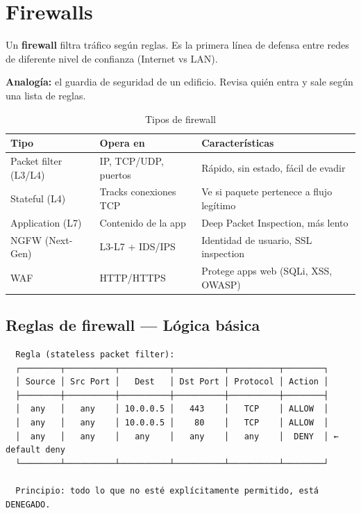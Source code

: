 \section{ Firewalls}

\begin{concepto}
Un \textbf{firewall} filtra tráfico según reglas. Es la primera línea
de defensa entre redes de diferente nivel de confianza (Internet vs LAN).

 \textbf{Analogía:} el guardia de seguridad de un edificio.
Revisa quién entra y sale según una lista de reglas.
\end{concepto}

\begin{table}[h!]
\centering
\renewcommand{\arraystretch}{1.4}
\begin{tabular}{lll}
\toprule
\textbf{Tipo} & \textbf{Opera en} & \textbf{Características} \\
\midrule
Packet filter (L3/L4) & IP, TCP/UDP, puertos & Rápido, sin estado, fácil de evadir \\
Stateful (L4)         & Tracks conexiones TCP & Ve si paquete pertenece a flujo legítimo \\
Application (L7)      & Contenido de la app   & Deep Packet Inspection, más lento \\
NGFW (Next-Gen)       & L3-L7 + IDS/IPS       & Identidad de usuario, SSL inspection \\
WAF                   & HTTP/HTTPS            & Protege apps web (SQLi, XSS, OWASP) \\
\bottomrule
\end{tabular}
\caption{Tipos de firewall}
\end{table}

\subsection{Reglas de firewall --- Lógica básica}

\begin{lstlisting}
  Regla (stateless packet filter):
  ┌────────┬──────────┬──────────┬──────────┬──────────┬────────┐
  │ Source │ Src Port │   Dest   │ Dst Port │ Protocol │ Action │
  ├────────┼──────────┼──────────┼──────────┼──────────┼────────┤
  │  any   │   any    │ 10.0.0.5 │   443    │   TCP    │ ALLOW  │
  │  any   │   any    │ 10.0.0.5 │    80    │   TCP    │ ALLOW  │
  │  any   │   any    │   any    │   any    │   any    │  DENY  │ ← default deny
  └────────┴──────────┴──────────┴──────────┴──────────┴────────┘

  Principio: todo lo que no esté explícitamente permitido, está DENEGADO.
\end{lstlisting}

